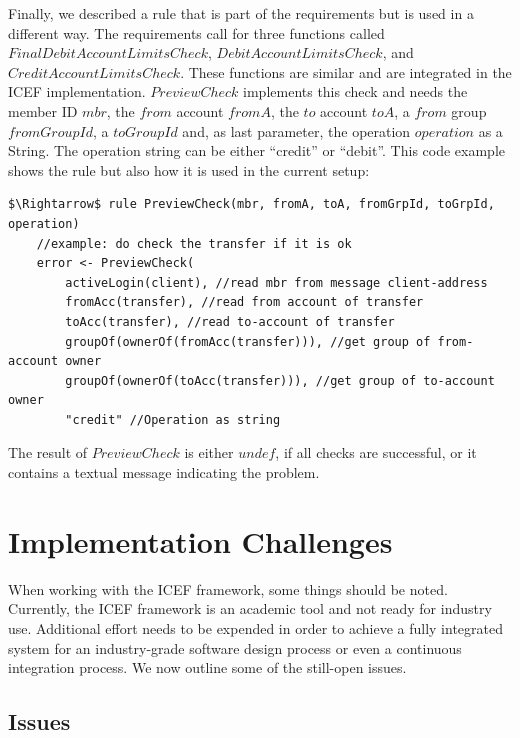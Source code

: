 Finally, we described a rule that is part of the requirements but is used in a different way. The requirements call for three functions called $FinalDebitAccountLimitsCheck$, $DebitAccountLimitsCheck$, and $CreditAccountLimitsCheck$. These functions are similar and are integrated in the ICEF implementation. $PreviewCheck$ implements this check and needs the member ID $mbr$, the $from$ account $fromA$, the $to$ account $toA$, a $from$ group $fromGroupId$, a $toGroupId$ and, as last parameter, the operation $operation$ as a String. The operation string can be either ``credit'' or ``debit''. This code example shows the rule but also how it is used in the current setup:

\begin{lstlisting}[language=bsl,mathescape=true]
	$\Rightarrow$ rule PreviewCheck(mbr, fromA, toA, fromGrpId, toGrpId, operation)
	//example: do check the transfer if it is ok
	error <- PreviewCheck(
		activeLogin(client), //read mbr from message client-address
		fromAcc(transfer), //read from account of transfer
		toAcc(transfer), //read to-account of transfer
		groupOf(ownerOf(fromAcc(transfer))), //get group of from-account owner
		groupOf(ownerOf(toAcc(transfer))), //get group of to-account owner
		"credit" //Operation as string
\end{lstlisting}

The result of $PreviewCheck$ is either $undef$, if all checks are successful, or it contains a textual message indicating the problem.

\section{Implementation Challenges}
\label{sec:impl-challenges}

When working with the ICEF framework, some things should be noted. Currently, the ICEF framework is an academic tool and not ready for industry use. Additional effort needs to be expended in order to achieve a fully integrated system for an industry-grade software design process or even a continuous integration process. We now outline some of the still-open issues.

\subsection{Issues}

